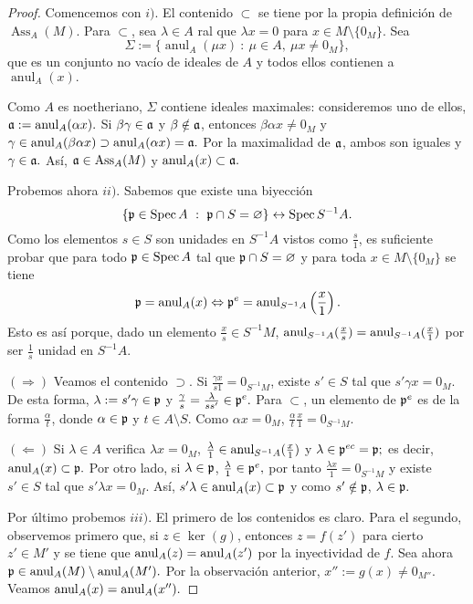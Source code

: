 \documentclass[../main.tex]{subfiles}
\begin{document}
	\begin{proof}
		Comencemos con $i)$. El contenido $\subset$ se tiene por la propia definición de $\operatorname{Ass}_A(M)$. Para $\subset$, sea $\lambda\in A$ ral que $\lambda x=0$ para $x\in M\setminus\{0_M\}.$ Sea
		$$\Sigma:=\{\operatorname{anul}_A(\mu x)\ :\ \mu\in A,\ \mu x\neq 0_M\},$$
		que es un conjunto no vacío de ideales de $A$ y todos ellos contienen a $\operatorname{anul}_A(x).$
		
		Como $A$ es noetheriano, $\Sigma$ contiene ideales maximales: consideremos uno de ellos, $\mathfrak{a}:=\operatorname{anul}_A(\alpha x).$ Si $\beta\gamma\in\mathfrak{a}$ y $\beta\notin\mathfrak{a}$, entonces $\beta\alpha x\neq 0_M$ y $\gamma\in\operatorname{anul}_A(\beta\alpha x)\supset\operatorname{anul}_A(\alpha x)=\mathfrak{a}.$ Por la maximalidad de $\mathfrak{a}$, ambos son iguales y $\gamma\in\mathfrak{a}.$ Así, $\mathfrak{a}\in\text{Ass}_A(M)$ y $\operatorname{anul}_A(x)\subset\mathfrak{a}.$
		
		Probemos ahora $ii).$ Sabemos que existe una biyección
		$$\{\mathfrak{p}\in\operatorname{Spec} A\ :\ \mathfrak{p}\cap S=\varnothing\}\leftrightarrow\operatorname{Spec}{S^{-1}A}.$$
		Como los elementos $s\in S$ son unidades en $S^{-1}A$ vistos como $\frac{s}{1}$, es suficiente probar que para todo $\mathfrak{p}\in\operatorname{Spec} A$ tal que $\mathfrak{p}\cap S=\varnothing$ y para toda $x\in M\setminus\{0_M\}$ se tiene
		$$\mathfrak{p}=\operatorname{anul}_A(x)\Leftrightarrow \mathfrak{p}^e=\operatorname{anul}_{S^{-1}A}\left(\frac{x}{1}\right).$$ Esto es así porque, dado un elemento $\frac{x}{s}\in S^{-1}M$, $\operatorname{anul}_{S^{-1}A}(\frac{x}{s})=\operatorname{anul}_{S^{-1}A}(\frac{x}{1})$ por ser $\frac{1}{s}$ unidad en $S^{-1}A.$
		
		$(\Rightarrow)$ Veamos el contenido $\supset$. Si $\frac{\gamma x}{s 1}=0_{S^{-1}M}$, existe $s'\in S$ tal que $s'\gamma x=0_M$. De esta forma, $\lambda:=s'\gamma\in\mathfrak{p}$ y $\frac{\gamma}{s}=\frac{\lambda}{ss'}\in\mathfrak{p}^e.$ Para $\subset$, un elemento de $\mathfrak{p}^e$ es de la forma $\frac{\alpha}{t}$, donde $\alpha\in\mathfrak{p}$ y $t\in A\setminus S.$ Como $\alpha x=0_M$, $\frac{\alpha}{t}\frac{x}{1}=0_{S^{-1}M}.$
		
		$(\Leftarrow)$ Si $\lambda\in A$ verifica $\lambda x=0_M$, $\frac{\lambda}{1}\in\operatorname{anul}_{S^{-1}A}(\frac{x}{1})$ y $\lambda\in\mathfrak{p}^{ec}=\mathfrak{p};$ es decir, $\operatorname{anul}_A(x)\subset\mathfrak{p}.$ Por otro lado, si $\lambda\in\mathfrak{p}$, $\frac{\lambda}{1}\in\mathfrak{p}^e,$ por tanto $\frac{\lambda x}{1}=0_{S^{-1}M}$ y existe $s'\in S$ tal que $s'\lambda x=0_M.$ Así, $s'\lambda\in\operatorname{anul}_A(x)\subset\mathfrak{p}$ y como $s'\notin\mathfrak{p}$, $\lambda\in\mathfrak{p}.$
		
		Por último probemos $iii).$ El primero de los contenidos es claro. Para el segundo, observemos primero que, si $z\in\ker(g)$, entonces $z=f(z')$ para cierto $z'\in M'$ y se tiene que $\operatorname{anul}_A(z)=\operatorname{anul}_A(z')$ por la inyectividad de $f.$ Sea ahora $\mathfrak{p}\in\operatorname{anul}_A(M)\setminus\operatorname{anul}_A(M').$ Por la observación anterior, $x'':=g(x)\neq 0_{M''}.$ Veamos $\operatorname{anul}_A(x)=\operatorname{anul}_A(x'').$
		

\end{proof}
\end{document}
